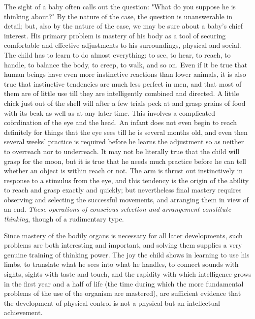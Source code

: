 \documentclass[letterpaper]{book}
\begin{document}
The sight of a baby often calls out the question: "What do you suppose
he is thinking about?" By the nature of the case, the question is
unanswerable in detail; but, also by the nature of the case, we may be
sure about a baby's chief interest. His primary problem is mastery of
his body as a tool of securing comfortable and effective adjustments to
his surroundings, physical and social. The child has to learn to do
almost everything: to see, to hear, to reach, to handle, to balance the
body, to creep, to walk, and so on. Even if it be true that human beings
have even more instinctive reactions than lower animals, it is also true
that instinctive tendencies are much less perfect in men, and that most
of them
are
of little use till they are intelligently combined and directed. A
little chick just out of the shell will after a few trials peck at and
grasp grains of food with its beak as well as at any later time. This
involves a complicated coördination of the eye and the head. An infant
does not even begin to reach definitely for things that the eye sees
till he is several months old, and even then several weeks' practice is
required before he learns the adjustment so as neither to overreach nor
to underreach. It may not be literally true that the child will grasp
for the moon, but it is true that he needs much practice before he can
tell whether an object is within reach or not. The arm is thrust out
instinctively in response to a stimulus from the eye, and this tendency
is the origin of the ability to reach and grasp exactly and quickly; but
nevertheless final mastery requires observing and selecting the
successful movements, and arranging them in view of an end. \emph{These
operations of conscious selection and arrangement constitute thinking},
though of a rudimentary type.


Since mastery of the bodily organs is necessary for all later
developments, such problems are both interesting and important, and
solving them supplies a very genuine training of thinking power. The joy
the child shows in learning to use his limbs, to translate what he sees
into what he handles, to connect sounds with sights, sights with taste
and touch, and the rapidity with which intelligence grows in the first
year and a half of life (the time during which the more fundamental
problems of the use of the organism are mastered), are sufficient
evidence that the development of physical control is not a physical but
an intellectual achievement.
\end{document}
